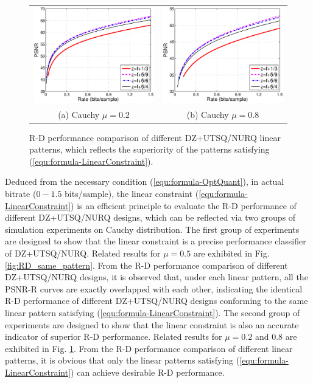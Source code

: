 \documentclass[smallabstract,smallcaptions]{dccpaper}
\begin{document}
\begin{figure}[tp]
\begin{center}
\begin{tabular}{cc}
\includegraphics[width = 0.5\linewidth]{Figures/section4/RD_Cauchy_mu=0_2_linear_patterns} &
\includegraphics[width = 0.5\linewidth]{Figures/section4/RD_Cauchy_mu=0_8_linear_patterns} \\
{\small (a) Cauchy $\mu=0.2$} & {\small (b) Cauchy $\mu=0.8$}
\end{tabular}
\end{center}
\vspace{-20pt}
\caption{\label{fig:RD_different_patterns}
R-D performance comparison of different DZ+UTSQ/NURQ linear patterns, which reflects the superiority of the patterns satisfying (\ref{equ:formula-LinearConstraint}).}
\end{figure} 

Deduced from the necessary condition (\ref{equ:formula-OptQuant}), in actual bitrate ($0-1.5$ bits/sample), the linear constraint (\ref{equ:formula-LinearConstraint}) is an efficient principle to evaluate the R-D performance of different DZ+UTSQ/NURQ designs, which can be reflected via two groups of simulation experiments on Cauchy distribution. The first group of experiments are designed to show that the linear constraint is a precise performance classifier of DZ+UTSQ/NURQ. Related results for $\mu = 0.5$ are exhibited in Fig. \ref{fig:RD_same_pattern}. From the R-D performance comparison of different DZ+UTSQ/NURQ designs, it is observed that, under each linear pattern, all the PSNR-R curves are exactly overlapped with each other, indicating the identical R-D performance of different DZ+UTSQ/NURQ designs conforming to the same linear pattern satisfying (\ref{equ:formula-LinearConstraint}). The second group of experiments are designed to show that the linear constraint is also an accurate indicator of superior R-D performance. Related results for $\mu = 0.2$ and $0.8$ are exhibited in Fig. \ref{fig:RD_different_patterns}. From the R-D performance comparison of different linear patterns, it is obvious that only the linear patterns satisfying (\ref{equ:formula-LinearConstraint}) can achieve desirable R-D performance.
\end{document}
